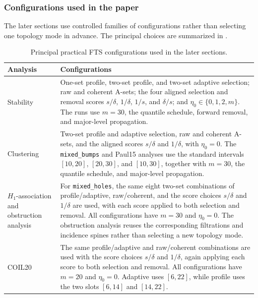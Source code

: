\documentclass[a4paper,11pt]{article}
\theoremstyle{definition}
\theoremstyle{remark}
\begin{document}
\subsubsection*{Configurations used in the paper}

The later sections use controlled families of configurations rather than selecting one topology mode in advance. The principal choices are summarized in .

\begin{table}[!ht]
\centering
\small
\caption{Principal practical FTS configurations used in the later sections.}
\label{tab:paper-topology-configurations}
\begin{tabular}{p{}p{}}
\toprule
Analysis & Configurations \\
\midrule
Stability &
One-set profile, two-set profile, and two-set adaptive selection; raw and coherent A-sets; the four aligned selection and removal scores $s/\delta$, $1/\delta$, $1/s$, and $\delta/s$; and $\eta_0\in\{0,1,2,m\}$. The runs use $m=30$, the quantile schedule, forward removal, and major-level propagation. \\[1mm]

Clustering &
Two-set profile and adaptive selection, raw and coherent A-sets, and the aligned scores $s/\delta$ and $1/\delta$, with $\eta_0=0$. The \texttt{mixed\_bumps} and Paul15 analyses use the standard intervals $[10,20]$, $[20,30]$, and $[10,30]$, together with $m=30$, the quantile schedule, and major-level propagation. \\[1mm]

$H_1$-association and obstruction analysis &
For \texttt{mixed\_holes}, the same eight two-set combinations of profile/adaptive, raw/coherent, and the score choices $s/\delta$ and $1/\delta$ are used, with each score applied to both selection and removal. All configurations have $m=30$ and $\eta_0=0$. The obstruction analysis reuses the corresponding filtrations and incidence spines rather than selecting a new topology mode. \\[1mm]

COIL20 &
The same profile/adaptive and raw/coherent combinations are used with the score choices $s/\delta$ and $1/\delta$, again applying each score to both selection and removal. All configurations have $m=20$ and $\eta_0=0$. Adaptive uses $[6,22]$, while profile uses the two slots $[6,14]$ and $[14,22]$. \\
\bottomrule
\end{tabular}
\end{table}
\end{document}
